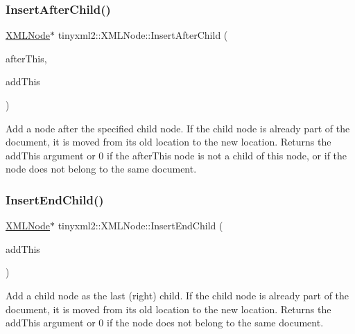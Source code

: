 \subsubsection{\texorpdfstring{InsertAfterChild()}{InsertAfterChild()}}
{\footnotesize\ttfamily \mbox{\hyperlink{classtinyxml2_1_1XMLNode}{X\+M\+L\+Node}}$\ast$ tinyxml2\+::\+X\+M\+L\+Node\+::\+Insert\+After\+Child (\begin{DoxyParamCaption}\item[{\mbox{\hyperlink{classtinyxml2_1_1XMLNode}{X\+M\+L\+Node}} $\ast$}]{after\+This,  }\item[{\mbox{\hyperlink{classtinyxml2_1_1XMLNode}{X\+M\+L\+Node}} $\ast$}]{add\+This }\end{DoxyParamCaption})}

Add a node after the specified child node. If the child node is already part of the document, it is moved from its old location to the new location. Returns the add\+This argument or 0 if the after\+This node is not a child of this node, or if the node does not belong to the same document. \mbox{\label{classtinyxml2_1_1XMLNode_aeb249ed60f4e8bfad3709151c3ee4286}} 
\subsubsection{\texorpdfstring{InsertEndChild()}{InsertEndChild()}}
{\footnotesize\ttfamily \mbox{\hyperlink{classtinyxml2_1_1XMLNode}{X\+M\+L\+Node}}$\ast$ tinyxml2\+::\+X\+M\+L\+Node\+::\+Insert\+End\+Child (\begin{DoxyParamCaption}\item[{\mbox{\hyperlink{classtinyxml2_1_1XMLNode}{X\+M\+L\+Node}} $\ast$}]{add\+This }\end{DoxyParamCaption})}

Add a child node as the last (right) child. If the child node is already part of the document, it is moved from its old location to the new location. Returns the add\+This argument or 0 if the node does not belong to the same document. \mbox{\label{classtinyxml2_1_1XMLNode_a8ff7dc071f3a1a6ae2ac25a37492865d}} 

